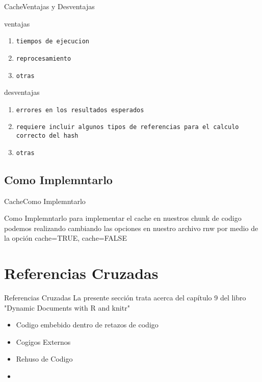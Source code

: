 \documentclass[10pt]{beamer}
\begin{document}
\begin{frame}{Cache}{Ventajas y Desventajas}
	\begin{block}{ventajas}
		\begin{enumerate}
			\item {\tt tiempos de ejecucion}
			\item {\tt reprocesamiento}
			\item {\tt otras}
		\end{enumerate}
	\end{block}
	\begin{block}{desventajas}
		\begin{enumerate}
			\item {\tt errores en los resultados esperados}
			\item {\tt requiere incluir algunos tipos de referencias para el calculo correcto del hash}
			\item {\tt otras}
		\end{enumerate}
	\end{block}
		
\end{frame}

\subsection{Como Implemntarlo}
\begin{frame}{Cache}{Como Implemntarlo}
	\begin{block}{Como Implemntarlo}
		para implementar el cache en nuestros chunk de codigo podemos realizando cambiando las opciones en nuestro archivo rnw por medio de la opción cache=TRUE, cache=FALSE
		
	\end{block}
\end{frame}


\section{Referencias Cruzadas}
\begin{frame}{Referencias Cruzadas}{}
	La presente sección trata acerca del capítulo 9 del libro "\alert{Dynamic Documents with R and knitr}" 
	\begin{itemize}
		\item<1-> Codigo embebido dentro de retazos de codigo
		\item<2-> Cogigos Externos
		\item<3-> Rehuso de Codigo
		\item<4-> 
	\end{itemize}
\end{frame}
\end{document}
